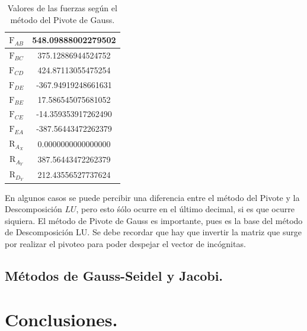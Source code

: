 \documentclass[12pt, notitlepage]{article}
\begin{document}
\begin{table}[H]
\centering
\caption{Valores de las fuerzas según el método del Pivote de Gauss.}
\begin{tabular}{|c|c|} \hline
$\text{F}_{AB}$ & 548.09888002279502 \\ \hline
$\text{F}_{BC}$ & 375.12886944524752 \\ \hline
$\text{F}_{CD}$ & 424.87113055475254 \\ \hline
$\text{F}_{DE}$ & -367.94919248661631 \\ \hline
$\text{F}_{BE}$ & 17.586545075681052 \\ \hline
$\text{F}_{CE}$ & -14.359353917262490 \\ \hline
$\text{F}_{EA}$ & -387.56443472262379 \\ \hline
$\text{R}_{A_X}$ & 0.0000000000000000 \\ \hline
$\text{R}_{A_Y}$ & 387.56443472262379 \\ \hline
$\text{R}_{D_Y}$ & 212.43556527737624 \\ \hline
\end{tabular}
\end{table}

En algunos casos se puede percibir una diferencia entre el método del Pivote y la Descomposición $LU$, pero esto śólo ocurre en el último decimal, si es que ocurre siquiera. El método de Pivote de Gauss es importante, pues es la base del método de Descomposición LU. Se debe recordar que hay que invertir la matriz que surge por realizar el pivoteo para poder despejar el vector de incógnitas.

\newpage

\subsection{Métodos de Gauss-Seidel y Jacobi.}



\newpage

\section{Conclusiones.}



\newpage

\begin{thebibliography}{3}



\end{thebibliography}
\end{document}
